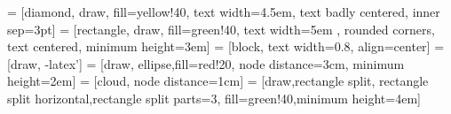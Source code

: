 \usepackage{latexsym,multicol,color,pstricks}

\headheight 15pt

 = [diamond, draw, fill=yellow!40, text width=4.5em, text badly centered, inner sep=3pt]
 = [rectangle, draw, fill=green!40, text width=5em	, rounded corners, text centered, minimum height=3em]
 = [block, text width=0.8\textwidth, align=center]
 = [draw, -latex']
 = [draw, ellipse,fill=red!20, node distance=3cm, minimum height=2em]
 = [cloud, node distance=1cm]
 = [draw,rectangle split, rectangle split horizontal,rectangle split parts=3, fill=green!40,minimum height=4em]

\overfullrule=2cm

